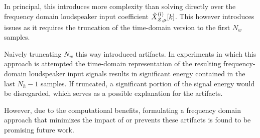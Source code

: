 In principal, this introduces more complexity than solving directly over the frequency domain loudspeaker input coefficient
$\tilde{X}^{(l)}_{\mathcal{Z},\mu}[k]$.
This however introduces issues as it requires the truncation of the time-domain version to the first $N_w$ samples.

Naively truncating $N_w$ this way introduced artifacts. 
In experiments in which this approach is attempted the time-domain representation of the resulting frequency-domain loudspeaker input signals 
results in significant energy contained in the last $N_h - 1$ samples.
If truncated, a significant portion of the signal energy would be disregarded, which serves as a possible explanation for the artifacts.

However, due to the computational benefits, formulating a frequency domain approach that minimizes the impact of or prevents these artifacts is 
found to be promising future work.



